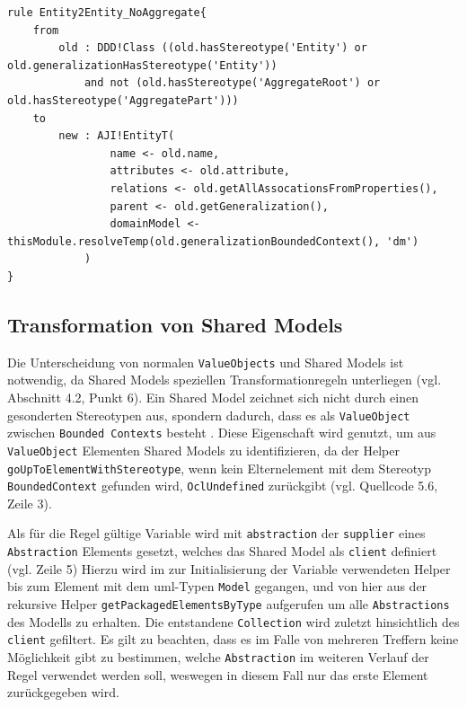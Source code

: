 \documentclass[
	oneside,  %
	ngerman, 
	final, 
	11pt, 
	a4paper, 
	1.1headlines, 
	headinclude=false, 
	footinclude=false, 
	mpinclude=false, 
	pagesize, 
	onecolumn, 
	titlepage, 
	parskip=half, 
	headsepline, 
	chapterprefix=false, 
	version=first, 
	listof=totoc, 
	bibliography=totoc, 
	toc=graduated, 
	fleqn
]{scrbook}
\begin{document}
\begin{lstlisting}[caption={Regel zur Erzeugung einer einfachen Entity},captionpos=b,label=Quellcode:Entity2Entity_NoAggregate] 
rule Entity2Entity_NoAggregate{
	from
		old : DDD!Class ((old.hasStereotype('Entity') or old.generalizationHasStereotype('Entity')) 
			and not (old.hasStereotype('AggregateRoot') or old.hasStereotype('AggregatePart')))
	to
		new : AJI!EntityT(
				name <- old.name,
				attributes <- old.attribute,
				relations <- old.getAllAssocationsFromProperties(),
				parent <- old.getGeneralization(),
				domainModel <- thisModule.resolveTemp(old.generalizationBoundedContext(), 'dm')
			)
}
\end{lstlisting}
\subsection{Transformation von Shared Models}
Die Unterscheidung von normalen \texttt{ValueObjects} und Shared Models ist notwendig, da Shared Models speziellen Transformationregeln unterliegen (vgl. Abschnitt 4.2, Punkt 6). Ein Shared Model zeichnet sich nicht durch einen gesonderten Stereotypen aus, spondern dadurch, dass es als \texttt{ValueObject} zwischen \texttt{Bounded Contexts} besteht \cite{DDDEvans}. Diese Eigenschaft wird genutzt, um aus \texttt{ValueObject} Elementen Shared Models zu identifizieren, da der Helper \texttt{goUpToElementWithStereotype}, wenn kein Elternelement mit dem Stereotyp \texttt{BoundedContext} gefunden wird, \texttt{OclUndefined} zurückgibt (vgl. Quellcode 5.6, Zeile 3). 

Als für die Regel gültige Variable wird mit \texttt{abstraction} der \texttt{supplier} eines \texttt{Abstraction} Elements gesetzt, welches das Shared Model als \texttt{client} definiert (vgl. Zeile 5) Hierzu wird im zur Initialisierung der Variable verwendeten Helper bis zum Element mit dem \ac{uml}-Typen \texttt{Model} gegangen, und von hier aus der rekursive Helper \texttt{getPackagedElementsByType} aufgerufen um alle \texttt{Abstractions} des Modells zu erhalten. Die entstandene \texttt{Collection} wird zuletzt hinsichtlich des \texttt{client} gefiltert. Es gilt zu beachten, dass es im Falle von mehreren Treffern keine Möglichkeit gibt zu bestimmen, welche \texttt{Abstraction} im weiteren Verlauf der Regel verwendet werden soll, weswegen in diesem Fall nur das erste Element zurückgegeben wird.
\end{document}
